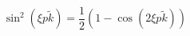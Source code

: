 \begin{equation} 
\sin^2(\xi p \tilde{k})= \frac{1}{2}(1- \cos(2\xi p \tilde{k}))
\label{21} 
\end{equation} 
